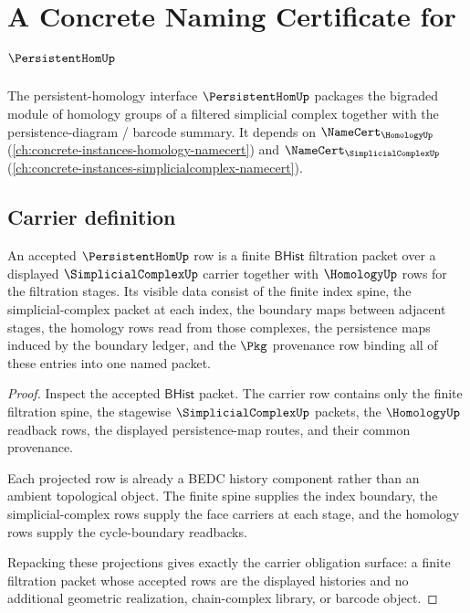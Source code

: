 \chapter{A Concrete Naming Certificate for $\PersistentHomUp$}
\label{ch:concrete-instances-persistenthom-namecert}

The persistent-homology interface $\PersistentHomUp$ packages the bigraded module of homology groups of a filtered simplicial complex together with the persistence-diagram / barcode summary. It depends on $\NameCert_{\HomologyUp}$ (\autoref{ch:concrete-instances-homology-namecert}) and $\NameCert_{\SimplicialComplexUp}$ (\autoref{ch:concrete-instances-simplicialcomplex-namecert}).

\section{Carrier definition}
\label{sec:persistenthom-carrier}

\begin{theorem}
\label{thm:persistenthom-carrier-obligation-surface}
An accepted $\PersistentHomUp$ row is a finite $\mathsf{BHist}$ filtration
packet over a displayed $\SimplicialComplexUp$ carrier together with
$\HomologyUp$ rows for the filtration stages. Its visible data consist of the
finite index spine, the simplicial-complex packet at each index, the boundary
maps between adjacent stages, the homology rows read from those complexes, the
persistence maps induced by the boundary ledger, and the $\Pkg$ provenance row
binding all of these entries into one named packet.
\end{theorem}
\begin{proof}
Inspect the accepted $\mathsf{BHist}$ packet. The carrier row contains only the
finite filtration spine, the stagewise $\SimplicialComplexUp$ packets, the
$\HomologyUp$ readback rows, the displayed persistence-map routes, and their
common provenance.

Each projected row is already a BEDC history component rather than an ambient
topological object. The finite spine supplies the index boundary, the
simplicial-complex rows supply the face carriers at each stage, and the
homology rows supply the cycle-boundary readbacks.

Repacking these projections gives exactly the carrier obligation surface: a
finite filtration packet whose accepted rows are the displayed histories and no
additional geometric realization, chain-complex library, or barcode object.
\end{proof}

